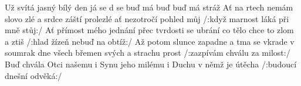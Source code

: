\begin{TEXT}{Už svítá jasný bílý den}
\SLOKA {}     \NL
já    \NL
se d  se   \NL
buď  má  buď    \NL
buď  má stráž   
\SLOKA Ať na     rtech nemám slovo zlé \NL
a srdce záští prolezlé \NL
ať nezotročí pohled můj \NL
/:když marnost láká při mně stůj:/ 
\SLOKA Ať přímost mého jednání \NL
přec tvrdosti se ubrání \NL
co tělo chce to zlom a ztiš \NL
/:hlad žízeň nebuď na obtíž:/ 
\SLOKA Až potom slunce zapadne \NL
a tma se vkrade v soumrak dne \NL
všech břemen svých a strachu prost \NL
/:zazpívám chválu za milost:/ 
\SLOKA Buď chvála Otci našemu \NL
i Synu jeho milému \NL
i Duchu v němž je útěcha \NL
/:budoucí dnešní odvěká:/
\end{TEXT}
